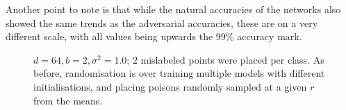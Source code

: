 \documentclass[12pt, oneside]{book}
\begin{document}
Another point to note is that while the natural accuracies of the networks also
showed the same trends as the adversarial accuracies, these are on a very
different scale, with all values being upwards the 99\% accuracy mark.

\begin{figure}[!h]
    \centering
    \qquad
    \caption{$d=64, b=2, \sigma^2=1.0$; $2$ mislabeled points were placed per
    class. As before, randomisation is over training multiple models with
    different initialisations, and placing poisons randomly sampled at a given
    $r$ from the means.}
    \label{fig:poison-toy-experiments}
\end{figure}
\end{document}
